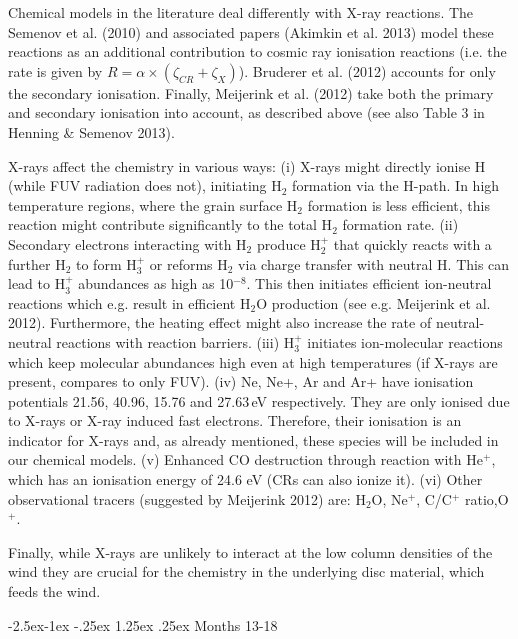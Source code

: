 \documentclass[10pt,fleqn,twoside]{article}
\makeatletter
\newcommand{\Tcol}{\color{blue}}
\renewcommand\paragraph{\@startsection{paragraph}{4}{\z@}%
            {-2.5ex\@plus -1ex \@minus -.25ex}%
            {1.25ex \@plus .25ex}%
            {\normalfont\normalsize\bfseries}}
\makeatother
\begin{document}
Chemical models in the literature deal differently with X-ray reactions. The Semenov et al. (2010) and associated papers (Akimkin et al. 2013) model these reactions as an additional contribution to cosmic ray ionisation reactions (i.e. the rate is given by $R = \alpha \times (\zeta_{CR} + \zeta_X)$). Bruderer et al. (2012) accounts for only the secondary ionisation. Finally, Meijerink et al. (2012) take both the primary and secondary ionisation into account, as described above (see also Table 3 in Henning \& Semenov 2013).

X-rays affect the chemistry in various ways: (i) X-rays might directly ionise H (while FUV radiation does not), initiating H$_2$ formation via the H-path. In high temperature regions, where the grain surface H$_2$ formation is less efficient, this reaction might contribute significantly to the total H$_2$ formation rate. (ii) Secondary electrons interacting with H$_2$ produce H$_2^+$ that quickly reacts with a further H$_2$ to form H$_3^+$ or reforms H$_2$ via charge transfer with neutral H. This can lead to H$_3^+$ abundances as high as 10$^{-8}$. This then initiates efficient ion-neutral reactions which e.g. result in efficient H$_2$O production (see e.g. Meijerink et al. 2012). Furthermore, the heating effect might also increase the rate of neutral-neutral reactions with reaction barriers. (iii) H$_3^+$ initiates ion-molecular reactions which keep molecular abundances high even at high temperatures (if X-rays are present, compares to only FUV). (iv)
Ne, Ne+, Ar and Ar+ have ionisation potentials 21.56, 40.96, 15.76 and 27.63\,eV respectively. They are only ionised due to X-rays or X-ray induced fast electrons. Therefore, their ionisation is an indicator for X-rays and, as already mentioned, these species will be included in our chemical models. (v) Enhanced CO destruction through reaction with He$^+$, which has an ionisation energy of 24.6 eV (CRs can also ionize it). (vi) Other observational tracers (suggested by Meijerink 2012) are: H$_2$O, Ne$^+$, C/C$^+$ ratio,O$^+$.

Finally, while X-rays are unlikely to interact at the low column densities of the wind they are crucial for the chemistry in the underlying disc material, which feeds the wind. 

\paragraph{\Tcol  Months 13-18}
\end{document}
